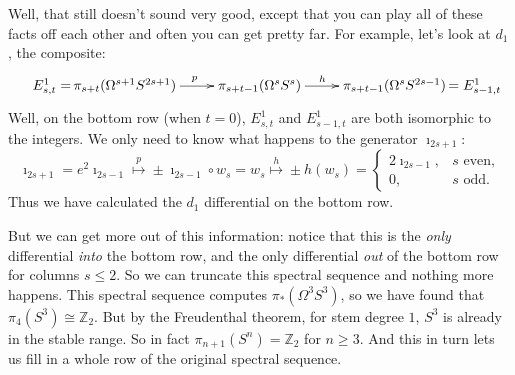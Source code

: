 \documentclass{article}
\newcommand{\ConfusedBox}[1]{
\begin{center}\scalebox{.5}{\fbox{\begin{minipage}{\textwidth}
#1
\end{minipage}}}
\end{center}
}
\newcommand{\Z}{\mathbb{Z}}
\newcommand{\Loops}{\Omega}
\renewcommand{\to}{\longrightarrow}
\theoremstyle{definition}
\begin{document}
Well, that still doesn't sound very good, except that you can play all of these facts off each other and often you can get pretty far.  For example, let's look at $d_1$, the composite:
\[\xymatrix{
\makebox[0cm][r]{$E^1_{s,t}=$\,}
\pi_{s+t}(\Omega^{s+1}S^{2s+1})\ar[r]^{\ p}&\pi_{s+t-1}(\Omega^s S^s)\ar[r]^{h\ \ }&\pi_{s+t-1}(\Omega^{s}S^{2s-1})\makebox[0cm][l]{\,$=E^1_{s-1,t}$}
}\]
Well, on the bottom row (when $t=0$), $E^1_{s,t}$ and $E^1_{s-1,t}$ are both isomorphic to the integers. We only need to know what happens to the generator $\imath_{2s+1}$:
\[\imath_{2s+1}=e^2\imath_{2s-1}\overset{p}{\longmapsto}\pm \imath_{2s-1}\circ w_{s}=w_s\overset{h}{\longmapsto} \pm h(w_s)=\begin{cases}2\imath_{2s-1},&\text{$s$ even,}\\0,&\text{$s$ odd.}\end{cases}\]
Thus we have calculated the $d_1$ differential on the bottom row.

But we can get more out of this information: notice that this is the \emph{only} differential \emph{into} the bottom row, and the only differential \emph{out} of the bottom row for columns $s \le 2$.  So we can truncate this spectral sequence and nothing more happens. This spectral sequence computes $\pi_* (\Loops^3 S^3)$, so we have found that $\pi_4 (S^3) \cong \Z_2$.  But by the Freudenthal theorem, for stem degree $1$, $S^3$ is already in the stable range.  So in fact $\pi_{n+1} (S^n) = \Z_2$ for $n \ge 3$.  And this in turn lets us fill in a whole row of the original spectral sequence.

\end{document}
